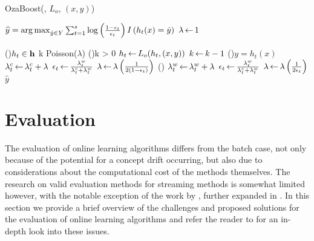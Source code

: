 \begin{algorithm}
	\small
	\caption{OzaBoost(\ensemble, $L_o$, $(x,y)$)}
	\label{alg:ozaboost}
	 \;
	$\widehat{y} = \operatorname*{arg\,max}_{\dot{y} \in Y} \sum_{t = 1}^{s} \log \left( \frac{1-\epsilon_t}{\epsilon_t} \right) I\left( h_t(x) = \dot{y} \right)$ \;
	 \;
	$\lambda {\,\leftarrow\,} 1$\;

	\ForEach(){$h_t \in \mathbf{h}$}{
		k  Poisson($\lambda$) \;
		\While(){k > 0}{
			$h_t {\,\leftarrow\,} L_o(h_t, (x,y))$ \;
			$k {\,\leftarrow\,} k-1$ \;
		}
		\If(){$y = h_t(x)$}{
			$\lambda^c_t {\,\leftarrow\,} \lambda^c_t + \lambda$ \;
			$\epsilon_t {\,\leftarrow\,} \frac{\lambda^w_t}{\lambda^c_t + \lambda^w_t}$ \;
			$\lambda {\,\leftarrow\,} \lambda \left( \frac{1}{2(1 - \epsilon_t)} \right)$ \;
		}\Else(){
			$\lambda^w_t {\,\leftarrow\,} \lambda^w_t + \lambda$ \;
			$\epsilon_t {\,\leftarrow\,} \frac{\lambda^w_t}{\lambda^c_t + \lambda^w_t}$ \;
			$\lambda {\,\leftarrow\,} \lambda \left( \frac{1}{2 \epsilon_t} \right)$ \;
		}
	}
	\Return $\widehat{y}$ \;
\end{algorithm}




\section{Evaluation}
\label{sec:bg-ol-evaluation}

The evaluation of online learning algorithms differs from the batch
case, not only because of the potential for a concept drift occurring,
but also due to considerations about the computational cost of the
methods themselves. The research on valid evaluation methods for
streaming methods is somewhat limited however, with the notable exception
of the work by \citet{online-evaluation-kdd}, further expanded in
\cite{online-evaluation-journal}.
In this section we provide
a brief overview of the challenges and proposed solutions for
the evaluation of online learning algorithms and refer the
reader to \cite{online-evaluation-journal} for an in-depth look
into these issues.

